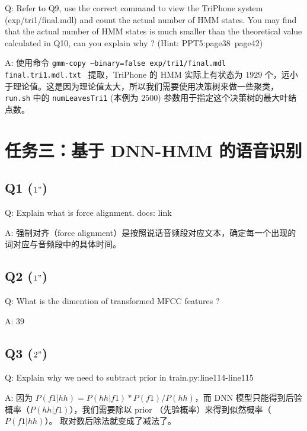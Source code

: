 \documentclass[degree=project,degree-type=project,cjk-font=noto]{thuthesis}
\begin{document}
Q: Refer to Q9, use the correct command to view the TriPhone system (exp/tri1/final.mdl) and count the actual number of HMM states. You may find that the actual number of HMM states is much smaller than the theoretical value calculated in Q10, can you explain why ? (Hint: PPT5:page38~page42)

A: 使用命令 \texttt{gmm-copy --binary=false exp/tri1/final.mdl final.tri1.mdl.txt } 提取，TriPhone 的 HMM 实际上有状态为 $1929$ 个，远小于理论值。这是因为理论值太大，所以我们需要使用决策树来做一些聚类，\texttt{run.sh} 中的 \texttt{numLeavesTri1} (本例为 $2500$) 参数用于指定这个决策树的最大叶结点数。

\chapter{任务三：基于 DNN-HMM 的语音识别}

\section{Q1 ($1"$)}

Q: Explain what is force alignment. docs: link

A: 强制对齐（force alignment）是按照说话音频段对应文本，确定每一个出现的词对应与音频段中的具体时间。

\section{Q2 ($1"$)}

Q: What is the dimention of transformed MFCC features ?

A: $39$

\section{Q3 ($2"$)}

Q: Explain why we need to subtract prior in train.py:line114-line115

A: 因为 $P(f1 | hh) = P(hh | f1) * P(f1) / P(hh)$，而 DNN 模型只能得到后验概率（$P(hh | f1)$），我们需要除以 prior （先验概率）来得到似然概率（$P(f1 | hh)$）。
取对数后除法就变成了减法了。

\backmatter


\appendix
\end{document}
